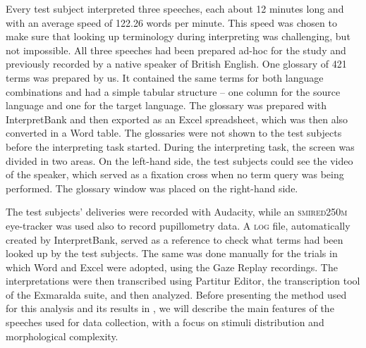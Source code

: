 \documentclass[output=paper]{langsci/langscibook}
\begin{document}
Every test subject interpreted three speeches, each about 12 minutes long and with an average speed of 122.26 words per minute. This speed was chosen to make sure that looking up terminology during interpreting was challenging, but not impossible. All three speeches had been prepared ad-hoc for the study and previously recorded by a native speaker of British English. One glossary of 421 terms was prepared by us. It contained the same terms for both language combinations and had a simple tabular structure – one column for the source language and one for the target language. The glossary was prepared with InterpretBank and then exported as an Excel spreadsheet, which was then also converted in a Word table. The glossaries were not shown to the test subjects before the interpreting task started. During the interpreting task, the screen was divided in two areas. On the left-hand side, the test subjects could see the video of the speaker, which served as a fixation cross when no term query was being performed. The glossary window was placed on the right-hand side.

The test subjects’ deliveries were recorded with Audacity, while an \textsc{smi\linebreak red250m} eye-tracker was used also to record pupillometry data. A \textsc{log} file, automatically created by InterpretBank, served as a reference to check what terms had been looked up by the test subjects. The same was done manually for the trials in which Word and Excel were adopted, using the Gaze Replay recordings. The interpretations were then transcribed using Partitur Editor, the transcription tool of the Exmaralda suite, and then analyzed. Before presenting the method used for this analysis and its results in , we will describe the main features of the speeches used for data collection, with a focus on stimuli distribution and morphological complexity.
\end{document}
